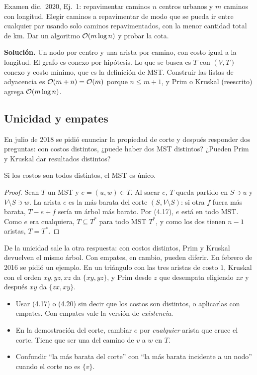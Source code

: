 \begin{problema}{Examen dic.~2020, Ej.~1: repavimentar caminos}
$n$ centros urbanos y $m$ caminos con longitud. Elegir caminos a repavimentar de modo que se pueda ir entre cualquier par usando solo caminos repavimentados, con la menor cantidad total de km. Dar un algoritmo $\mathcal{O}(m\log n)$ y probar la cota.

\smallskip
\textbf{Solución.} Un nodo por centro y una arista por camino, con costo igual a la longitud. El grafo es conexo por hipótesis. Lo que se busca es $T$ con $(V,T)$ conexo y costo mínimo, que es la definición de MST. Construir las listas de adyacencia es $\mathcal{O}(m+n)=\mathcal{O}(m)$ porque $n\le m+1$, y Prim o Kruskal (reescrito) agrega $\mathcal{O}(m\log n)$.
\end{problema}

\subsection{Unicidad y empates}

En julio de 2018 se pidió enunciar la propiedad de corte y después responder dos preguntas: con costos distintos, ¿puede haber dos MST distintos? ¿Pueden Prim y Kruskal dar resultados distintos?

\begin{resultado}[Unicidad (KT Ej.~4.8)]
Si los costos son todos distintos, el MST es único.
\end{resultado}

\begin{proof}
Sean $T$ un MST y $e=(u,w)\in T$. Al sacar $e$, $T$ queda partido en $S\ni u$ y $V\setminus S\ni w$. La arista $e$ es la más barata del corte $(S,V\setminus S)$: si otra $f$ fuera más barata, $T-e+f$ sería un árbol más barato. Por (4.17), $e$ está en todo MST. Como $e$ era cualquiera, $T\subseteq T^*$ para todo MST $T^*$, y como los dos tienen $n-1$ aristas, $T=T^*$.
\end{proof}

De la unicidad sale la otra respuesta: con costos distintos, Prim y Kruskal devuelven el mismo árbol. Con empates, en cambio, pueden diferir. En febrero de 2016 se pidió un ejemplo. En un triángulo con las tres aristas de costo $1$, Kruskal con el orden $xy,yz,xz$ da $\{xy,yz\}$, y Prim desde $z$ que desempata eligiendo $zx$ y después $xy$ da $\{zx,xy\}$.

\begin{trampa}[MST]
\begin{itemize}
  \item Usar (4.17) o (4.20) sin decir que los costos son distintos, o aplicarlas con empates. Con empates vale la versión de \emph{existencia}.
  \item En la demostración del corte, cambiar $e$ por \emph{cualquier} arista que cruce el corte. Tiene que ser una del camino de $v$ a $w$ en $T$.
  \item Confundir ``la más barata del corte'' con ``la más barata incidente a un nodo'' cuando el corte no es $\{v\}$.
\end{itemize}
\end{trampa}


